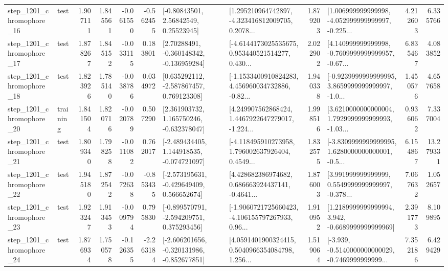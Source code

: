 \begin{tabular}{llrrrrllrlrr}
 step\_1201\_chromophore\_16 &      test &      1.907111 &    1.845561 &     -0.061550 & -0.562455 &       [-0.80843501, 2.56842549, 0.25523945] &  [1.295210964742897, -4.323416812009705, 0.2078... &       1.879203 &  [1.006999999999998, -4.052999999999997, -0.225... &            4.212603 &          6.335766 \\
 step\_1201\_chromophore\_17 &      test &      1.878267 &    1.845152 &     -0.033115 &  0.183801 &    [2.70288491, -0.360148342, -0.136959284] &  [-4.6144173025535675, 0.953440521514277, 0.430... &       2.022902 &  [4.140999999999998, -0.7609999999999957, -0.67... &            6.835467 &          4.083852 \\
 step\_1201\_chromophore\_18 &      test &      1.823926 &    1.785140 &     -0.038786 &  0.034972 &    [0.635292112, -2.587867457, 0.769123308] &  [-1.1533400910824283, 4.456960034732886, -0.82... &       1.940338 &  [-0.9239999999999995, 3.8659999999999997, -1.0... &            1.450576 &          4.657658 \\
 step\_1201\_chromophore\_20 &  training &      1.841504 &    1.820716 &     -0.020789 &  0.507290 &    [2.361903732, 1.165750246, -0.632378047] &  [4.249907562868424, 1.4467922647279017, -1.224... &       1.998516 &  [3.6210000000000004, 1.7929999999999993, -1.03... &            0.936062 &          7.337004 \\
 step\_1201\_chromophore\_21 &      test &      1.809340 &    1.798258 &     -0.011082 &  0.762017 &   [-2.489434405, 1.144918535, -0.074721097] &  [-4.118495910273958, 1.796002637926404, 0.4549... &       1.832575 &  [-3.8309999999999995, 1.6280000000000001, -0.5... &            6.154867 &         13.279331 \\
 step\_1201\_chromophore\_22 &      test &      1.945180 &    1.872542 &     -0.072638 & -0.853435 &   [-2.573195631, -0.429649409, 0.566652674] &  [4.428682386974682, 0.686663924437141, -0.4641... &       1.876003 &  [3.991999999999999, 0.5549999999999997, -0.378... &            7.067632 &          1.052657 \\
 step\_1201\_chromophore\_23 &      test &      1.923247 &    1.913453 &     -0.009794 &  0.795830 &   [-0.899570791, -2.594209751, 0.375293456] &  [-1.9060721725660423, -4.106155797267933, 0.96... &       1.910952 &   [1.2189999999999994, 3.942, -0.6689999999999969] &            2.391773 &          8.109895 \\
 step\_1201\_chromophore\_24 &      test &      1.876934 &    1.750578 &     -0.126355 & -2.263184 &  [-2.606201656, -0.320131986, -0.852677851] &  [4.0591401900324415, 0.5040966354084798, 1.256... &       1.519064 &  [-3.939, -0.5140000000000029, -0.7469999999999... &            7.352186 &          6.429429 \\

\end{tabular}
